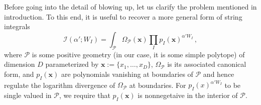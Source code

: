 \documentclass[12pt]{article}
\theoremstyle{definition}
\theoremstyle{plain}
\begin{document}
% 


Before going into the detail of blowing up, let us clarify the problem mentioned in introduction. To this end, it is useful to recover a more general form of string integrals
\begin{equation*}
  \mathcal{I}(\alpha';W_{I})=\int_{\mathcal{P}} \Omega_{\mathcal{P}}(\mathbf{x}) \prod_{I}p_{I}(\mathbf{x})^{\alpha'W_{I}}\,,
\end{equation*}
where $\mathcal{P}$ is some positive geometry (in our case, it is some simple polytope) of dimension $D$ parameterized by $\mathbf{x}:= \{x_{1},\ldots,x_{D}\}$, $\Omega_{\mathcal{P}}$ is its associated canonical form, and $p_{I}(\mathbf{x})$ are polynomials vanishing at boundaries of $\mathcal{P}$ and hence regulate the logarithm divergence of $\Omega_{\mathcal{P}}$ at boundaries. For $p_{I}(x)^{\alpha' W_{I}}$ to be single valued in $\mathcal{P}$, we require that $p_{I}(\mathbf{x})$ is nonnegetaive in the interior of $\mathcal{P}$. %
\end{document}
